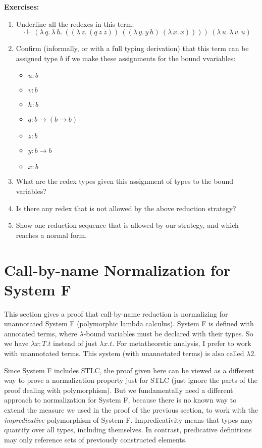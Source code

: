 \documentclass{article}
\begin{document}
\textbf{Exercises:} 
\begin{enumerate}
\item Underline all the redexes in this term:
  \[
  \cdot\vdash (\lambda\,q.\,\lambda\,h.\,((\lambda\, z.\,(q\ z\ z))\ ((\lambda\, y.\,y\, h)\ (\lambda\,x.\,x))))\ (\lambda\,u.\,\lambda\,v.\,u)
  \]
\item Confirm (informally, or with a full typing derivation) that this term can be assigned type $b$ if we make these assignments for the bound vvariables:
  \begin{itemize}
  \item $u : b$
  \item $v : b$    
  \item $h : b$
  \item $q : b \to (b \to b)$
  \item $z : b$
  \item $y : b \to b$
  \item $x : b$
  \end{itemize}

\item What are the redex types given this assignment of types to the bound variables?

\item Is there any redex that is not allowed by the above reduction strategy?

\item Show one reduction sequence that is allowed by our strategy, and which
  reaches a normal form.
\end{enumerate}

\section{Call-by-name Normalization for System F}

This section gives a proof that call-by-name reduction is normalizing
for unannotated System F (polymorphic lambda calculus).  System F is
defined with annotated terms, where $\lambda$-bound variables must be
declared with their types.  So we have $\lambda x:T.t$ instead of just
$\lambda x.t$.  For metatheoretic analysis, I prefer to work with
unannotated terms.  This system (with unannotated terms) is also
called $\lambda2$.

Since System F includes STLC, the proof given here can be viewed as a
different way to prove a normalization property just for STLC (just
ignore the parts of the proof dealing with polymorphism).  But we
fundamentally need a different approach to normalization for System F,
because there is no known way to extend the measure we used in the
proof of the previous section, to work with the \emph{impredicative} polymorphism
of System F.  Impredicativity means that types may quantify over all types,
including themselves.  In contrast, predicative definitions may only
reference sets of previously constructed elements.
\end{document}
